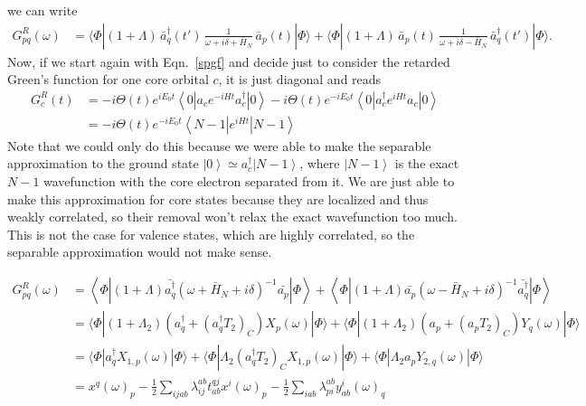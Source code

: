 \begin{tcolorbox}
we can write
\begin{align}
    G_{pq}^R(\omega) 
    &= \langle \Phi | (1+\Lambda)\,
    \bar{a}_q^\dagger(t') \,
    \frac{1}{\omega + i\delta + \bar{H}_N} \,
    \bar{a}_p(t)
    |\Phi\rangle
    + \langle \Phi | (1+\Lambda)\,
    \bar{a}_p(t) \,
    \frac{1}{\omega + i\delta - \bar{H}_N} \,
    \bar{a}_q^\dagger(t')
    |\Phi\rangle .
\end{align}
Now, if we start again with Eqn.~\ref{spgf} and decide just to consider the retarded Green's function for one core orbital $c$, it is just diagonal and reads
\begin{align}
    G_{c}^{R}(t) & = -i \Theta(t) e^{iE_0t} \left<0\left| a_c e^{-iHt} a_c^\dagger \right| 0 \right> -i \Theta(t) e^{-iE_0t}\left<0\left| a_c^\dagger e^{iHt} a_c \right| 0 \right> \\
    & = -i \Theta(t) e^{-iE_0t}\left<N-1\left| e^{iHt} \right| N-1 \right>
\end{align}
Note that we could only do this because we were able to make the separable approximation to the ground state $\left| 0 \right> \simeq a_c^\dagger \left| N-1 \right>$, where $\left| N-1 \right>$ is the exact $N-1$ wavefunction with the core electron separated from it. We are just able to make this approximation for core states because they are localized and thus weakly correlated, so their removal won't relax the exact wavefunction too much. This is not the case for valence states, which are highly correlated, so the separable approximation would not make sense.
\end{tcolorbox}
\begin{align}
G_{pq}^R (\omega) &= \left\langle \Phi \left| (1+\Lambda) \bar{a^{\dagger}_q}
(\omega + \bar{H}_N + i\delta)^{-1} \bar{a_p} \right| \Phi \right\rangle + \left\langle \Phi \left| (1+\Lambda) \bar{a_p}
(\omega - \bar{H}_N + i\delta)^{-1} \bar{a^{\dagger}_q} \right| \Phi \right\rangle \\
&= \langle\Phi|\left(1+\Lambda_2\right)\left(a_q^{\dagger}+\left(a_q^{\dagger} T_2\right)_C\right) X_p(\omega)|\Phi\rangle+\langle\Phi|\left(1+\Lambda_2\right)\left(a_p+\left(a_p T_2\right)_C\right) Y_q(\omega)|\Phi\rangle \label{eq:ccgf_expanded_2}\\
&= \langle\Phi| a_q^{\dagger} X_{1, p}(\omega)|\Phi\rangle+\langle\Phi| \Lambda_2\left(a_q^{\dagger} T_2\right)_C X_{1, p}(\omega)|\Phi\rangle+\langle\Phi| \Lambda_2 a_p Y_{2, q}(\omega)|\Phi\rangle \label{eq:ccgf_expanded_3} \\
&= x^q(\omega)_p-\frac{1}{2} \sum_{i j a b} \lambda_{i j}^{a b} t_{a b}^{q j} x^i(\omega)_p-\frac{1}{2} \sum_{i a b} \lambda_{p i}^{a b} y_{a b}^i(\omega)_q
\end{align}
